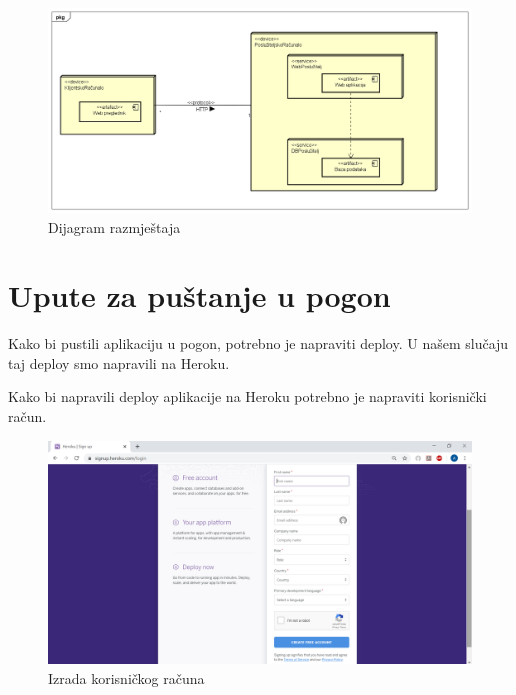 \normalfont{}

\begin{figure}[H]
	\includegraphics[scale=0.4]{slike/DijagramRazmjestaja.PNG}
	\centering
	\caption{Dijagram razmještaja}
	\label{fig:promjene}
\end{figure}

\eject 

\section{Upute za puštanje u pogon}

\normalfont Kako bi pustili aplikaciju u pogon, potrebno je napraviti deploy. U našem slučaju taj deploy smo napravili na Heroku. 

\normalfont\noindent Kako bi napravili deploy aplikacije na Heroku potrebno je napraviti korisnički račun.

\begin{figure}[H]
	\includegraphics[scale=0.4]{slike/korisnicki_racun.PNG}
	\centering
	\caption{Izrada korisničkog računa}
	\label{fig:pogon1}
\end{figure}

